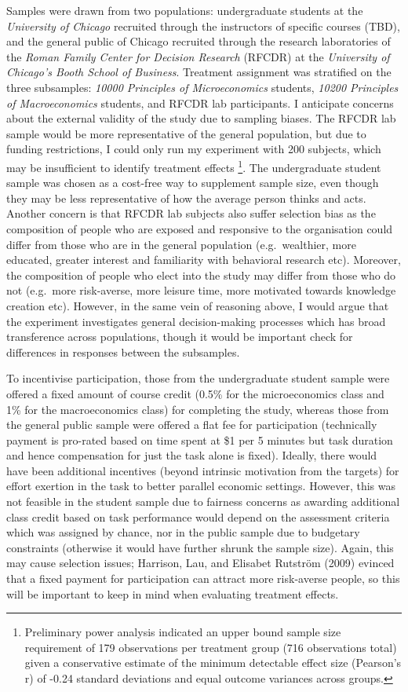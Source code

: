 \documentclass[
  12,
  letterpaper,
  DIV=11,
  numbers=noendperiod]{scrartcl}
\begin{document}
Samples were drawn from two populations: undergraduate students at the
\emph{University of Chicago} recruited through the instructors of
specific courses (TBD), and the general public of Chicago recruited
through the research laboratories of the \emph{Roman Family Center for
Decision Research} (RFCDR) at the \emph{University of Chicago's Booth
School of Business}. Treatment assignment was stratified on the three
subsamples: \emph{10000 Principles of Microeconomics} students,
\emph{10200 Principles of Macroeconomics} students, and RFCDR lab
participants. I anticipate concerns about the external validity of the
study due to sampling biases. The RFCDR lab sample would be more
representative of the general population, but due to funding
restrictions, I could only run my experiment with 200 subjects, which
may be insufficient to identify treatment effects \footnote{Preliminary
  power analysis indicated an upper bound sample size requirement of 179
  observations per treatment group (716 observations total) given a
  conservative estimate of the minimum detectable effect size (Pearson's
  r) of -0.24 standard deviations and equal outcome variances across
  groups.}. The undergraduate student sample was chosen as a cost-free
way to supplement sample size, even though they may be less
representative of how the average person thinks and acts. Another
concern is that RFCDR lab subjects also suffer selection bias as the
composition of people who are exposed and responsive to the organisation
could differ from those who are in the general population
(e.g.~wealthier, more educated, greater interest and familiarity with
behavioral research etc). Moreover, the composition of people who elect
into the study may differ from those who do not (e.g.~more risk-averse,
more leisure time, more motivated towards knowledge creation etc).
However, in the same vein of reasoning above, I would argue that the
experiment investigates general decision-making processes which has
broad transference across populations, though it would be important
check for differences in responses between the subsamples.

To incentivise participation, those from the undergraduate student
sample were offered a fixed amount of course credit (0.5\% for the
microeconomics class and 1\% for the macroeconomics class) for
completing the study, whereas those from the general public sample were
offered a flat fee for participation (technically payment is pro-rated
based on time spent at \$1 per 5 minutes but task duration and hence
compensation for just the task alone is fixed). Ideally, there would
have been additional incentives (beyond intrinsic motivation from the
targets) for effort exertion in the task to better parallel economic
settings. However, this was not feasible in the student sample due to
fairness concerns as awarding additional class credit based on task
performance would depend on the assessment criteria which was assigned
by chance, nor in the public sample due to budgetary constraints
(otherwise it would have further shrunk the sample size). Again, this
may cause selection issues; Harrison, Lau, and Elisabet Rutström (2009)
evinced that a fixed payment for participation can attract more
risk-averse people, so this will be important to keep in mind when
evaluating treatment effects.
\end{document}
